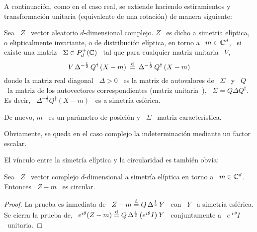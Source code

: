 A continuaci\'on,  como en  el caso real,  se extiende haciendo  estiramientos y
transformaci\'on unitaria (equivalente de una rotaci\'on) de manera siguiente:
%
\begin{definicion}\label{Def:MP:ElipticoComplejo}
  Sea  \ $Z$  \ vector  aleatorio $d$-dimensional  complejo.  $Z$  \ es  dicho a
  simetr\'ia  el\'iptica,   o  elipticalmente  invariante,   o  de  distribuci\'on
  el\'iptica, en torno a \ $m \in  \mathbb{C}^d$, \ si existe una matriz \ $\Sigma \in
  P_d^+(\mathbb{C})$ \ tal que para cualquier matriz unitaria \ $V$,
  \[
  V  \,   \Delta^{-\frac12}  \,  Q^\dag  \left(   X  -  m  \right)   \:  \stackrel{\mathrm{d}}{=}  \:
  \Delta^{-\frac12} \, Q^\dag \left( X - m \right)
  \]
  donde la matriz real diagonal \ $\Delta  > 0$ \ es la matriz de autovalores de
  \ $\Sigma$ \ y \ $Q$  \ la matriz de los autovectores correspondientes (matriz
  unitaria~\cite{Bha97,  Bha07, HorJoh13}),  \ $\Sigma  = Q  \Delta  Q^\dag$. Es
  decir, \  $\Delta^{-\frac12} Q^\dag \left(  X - m  \right)$ \ es  a simetr\'ia
  esf\'erica.

  De  nuevo, $m$  \  es  un par\'ametro  de  posici\'on y  \  $\Sigma$ \  matriz
  caracter\'istica.
\end{definicion}
%
Obviamente, se queda en el caso complejo la indeterminaci\'on mediante un factor
escalar.

El v\'inculo entre la simetr\'ia el\'iptica y la circularidad es tambi\'en obvia:
%
\begin{lema}
  Sea \ $Z$ \ vector complejo  $d$-dimensional a simetr\'ia el\'iptica en torno a
  \ $m \in \mathbb{C}^d$. Entonces \ $Z-m$ \ es circular.
\end{lema}
%
\begin{proof}
  La prueba es  inmediata de \ $Z-m \stackrel{\mathrm{d}}{=}  Q \, \Delta^{\frac12} \, Y$  \ con \
  $Y$ \  a simetr\'ia  esf\'erica. Se  cierra la prueba  de, \  $e^{\imath \theta}
  (Z-m) \stackrel{\mathrm{d}}{=} Q \, \Delta^{\frac12} \,  \big( e^{\imath \theta} I \big) \, Y$ \
  conjuntamente a \ $e^{\imath \theta} I$ \ unitaria.
\end{proof}


